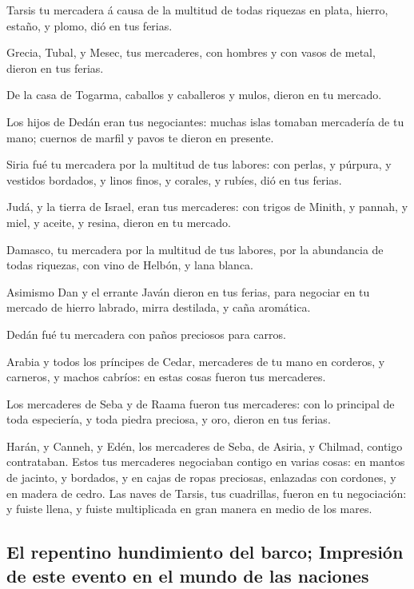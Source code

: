  Tarsis tu mercadera á causa de la multitud de todas
riquezas en plata, hierro, estaño, y plomo, dió en tus ferias.

 Grecia, Tubal, y Mesec, tus mercaderes, con hombres y con
vasos de metal, dieron en tus ferias.

 De la casa de Togarma, caballos y caballeros y mulos,
dieron en tu mercado.

 Los hijos de Dedán eran tus negociantes: muchas islas
tomaban mercadería de tu mano; cuernos de marfil y pavos te dieron en
presente.

 Siria fué tu mercadera por la multitud de tus labores: con
perlas, y púrpura, y vestidos bordados, y linos finos, y corales, y
rubíes, dió en tus ferias.

 Judá, y la tierra de Israel, eran tus mercaderes: con
trigos de Minith, y pannah, y miel, y aceite, y resina, dieron en tu
mercado.

 Damasco, tu mercadera por la multitud de tus labores, por
la abundancia de todas riquezas, con vino de Helbón, y lana blanca.

 Asimismo Dan y el errante Javán dieron en tus ferias, para
negociar en tu mercado de hierro labrado, mirra destilada, y caña
aromática.

 Dedán fué tu mercadera con paños preciosos para carros.

 Arabia y todos los príncipes de Cedar, mercaderes de tu
mano en corderos, y carneros, y machos cabríos: en estas cosas fueron
tus mercaderes.

 Los mercaderes de Seba y de Raama fueron tus mercaderes:
con lo principal de toda especiería, y toda piedra preciosa, y oro,
dieron en tus ferias.

 Harán, y Canneh, y Edén, los mercaderes de Seba, de
Asiria, y Chilmad, contigo contrataban.  Estos tus
mercaderes negociaban contigo en varias cosas: en mantos de jacinto, y
bordados, y en cajas de ropas preciosas, enlazadas con cordones, y en
madera de cedro.  Las naves de Tarsis, tus cuadrillas,
fueron en tu negociación: y fuiste llena, y fuiste multiplicada en gran
manera en medio de los mares.

\hypertarget{el-repentino-hundimiento-del-barco-impresiuxf3n-de-este-evento-en-el-mundo-de-las-naciones}{%
\subsection{El repentino hundimiento del barco; Impresión de este evento
en el mundo de las
naciones}\label{el-repentino-hundimiento-del-barco-impresiuxf3n-de-este-evento-en-el-mundo-de-las-naciones}}

